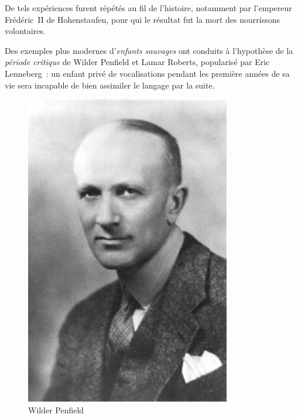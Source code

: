 \begin{minipage}[H]{0.65\linewidth}
De tels expériences furent répétés au fil de l'histoire, notamment par l'empereur Frédéric~II de Hohenstaufen, pour qui le résultat fut la mort des nourrissons volontaires\cite{ggcoulton-francis-to-dante}. 

Des exemples plus modernes d'\emph{enfants sauvages} ont conduits à l'hypothèse de la \emph{période critique} de Wilder Penfield et Lamar Roberts\cite{penfield2003speech}, popularisé par Eric Lenneberg\cite{lenneberg-crit-period}~: un enfant privé de vocalisations pendant les première années de sa vie sera incapable de bien assimiler le langage par la suite.
\vspace{1cm}
\end{minipage}
\begin{minipage}[H]{0.34\linewidth}
  \begin{figure}[H]
  \centering
  \includegraphics[width=0.8\textwidth]{../resources/illustrations/penfield}
  \caption{Wilder Penfield}
  \end{figure}
\end{minipage}

